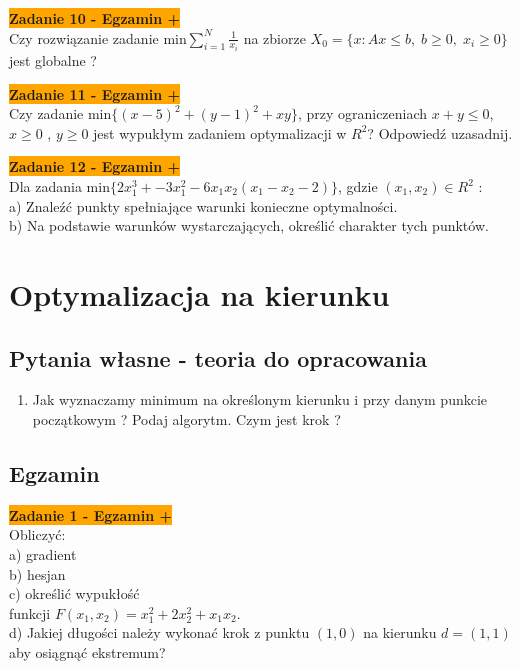 \documentclass[a4paper,11pt]{article}
\begin{document}
\begin{framed}
\textbf{\colorbox{orange}{Zadanie 10 - Egzamin +}} \\
Czy rozwiązanie zadanie \( \text{min} \sum_{i=1}^N \frac{1}{x_i} \) na zbiorze \( X_0 = \{ x: Ax \leq b , \; b \geq 0 , \; x_i \geq 0 \} \) jest globalne ? 
\end{framed}

\begin{framed}
\textbf{\colorbox{orange}{Zadanie 11 - Egzamin +}} \\
Czy zadanie \( \text{min} \{ (x-5)^2+(y-1)^2+xy\} \), przy ograniczeniach \( x+y \leq 0 \), \( x \geq 0 \) , \( y \geq 0 \) jest wypukłym zadaniem optymalizacji w \( R^2 \)? Odpowiedź uzasadnij.
\end{framed}

\begin{framed}
\textbf{\colorbox{orange}{Zadanie 12 - Egzamin + }} \\
Dla zadania \( \text{min} \{ 2x_1^3+-3x_1^2-6x_1x_2(x_1-x_2-2)\} \), gdzie \( (x_1,x_2) \in R^2 \) : \\
a) Znaleźć punkty spełniające warunki konieczne optymalności. \\
b) Na podstawie warunków wystarczających, określić charakter tych punktów.
\end{framed}





\newpage
\section{Optymalizacja na kierunku}

\subsection{Pytania własne - teoria do opracowania}
\begin{enumerate}

\item Jak wyznaczamy minimum na określonym kierunku i przy danym punkcie początkowym ? Podaj algorytm. Czym jest krok ? 


\end{enumerate}

\subsection{Egzamin}

\begin{framed}
\textbf{\colorbox{orange}{Zadanie 1 - Egzamin +}} \\
Obliczyć: \\
a) gradient \\
b) hesjan \\
c) określić wypukłość \\
funkcji \( F(x_1,x_2) = x_1^2+2x_2^2+x_1x_2 \). \\
d) Jakiej długości należy wykonać krok z punktu \( (1,0) \) na kierunku \( d=(1,1) \) aby osiągnąć ekstremum? 
\end{framed}
\end{document}
